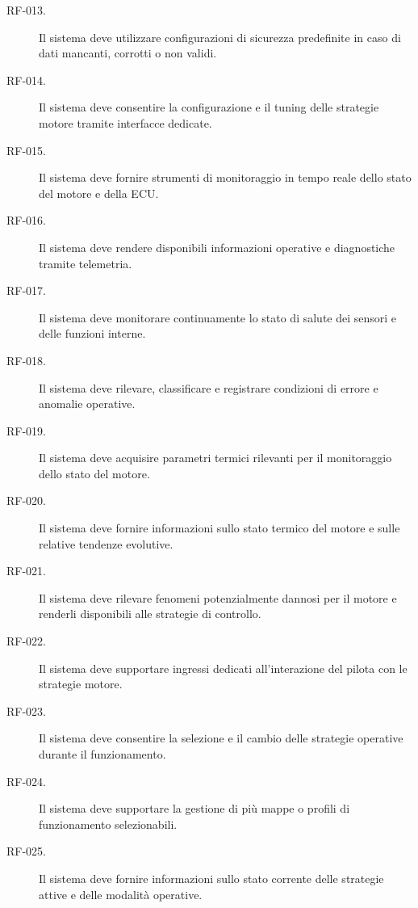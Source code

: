 \documentclass{article}
\begin{document}
\begin{description}
    \item[RF-013.] Il sistema deve utilizzare configurazioni di sicurezza
          predefinite in caso di dati mancanti, corrotti o non validi.

    \item[RF-014.] Il sistema deve consentire la configurazione e il tuning
          delle strategie motore tramite interfacce dedicate.

    \item[RF-015.] Il sistema deve fornire strumenti di monitoraggio in tempo
          reale dello stato del motore e della ECU.

    \item[RF-016.] Il sistema deve rendere disponibili informazioni operative e
          diagnostiche tramite telemetria.

    \item[RF-017.] Il sistema deve monitorare continuamente lo stato di salute
          dei sensori e delle funzioni interne.

    \item[RF-018.] Il sistema deve rilevare, classificare e registrare
          condizioni di errore e anomalie operative.

    \item[RF-019.] Il sistema deve acquisire parametri termici rilevanti per il
          monitoraggio dello stato del motore.

    \item[RF-020.] Il sistema deve fornire informazioni sullo stato termico del
          motore e sulle relative tendenze evolutive.

    \item[RF-021.] Il sistema deve rilevare fenomeni potenzialmente dannosi per
          il motore e renderli disponibili alle strategie di controllo.

    \item[RF-022.] Il sistema deve supportare ingressi dedicati all'interazione
          del pilota con le strategie motore.

    \item[RF-023.] Il sistema deve consentire la selezione e il cambio delle
          strategie operative durante il funzionamento.

    \item[RF-024.] Il sistema deve supportare la gestione di più mappe o profili
          di funzionamento selezionabili.

    \item[RF-025.] Il sistema deve fornire informazioni sullo stato corrente
          delle strategie attive e delle modalità operative.


\end{description}
\end{document}

